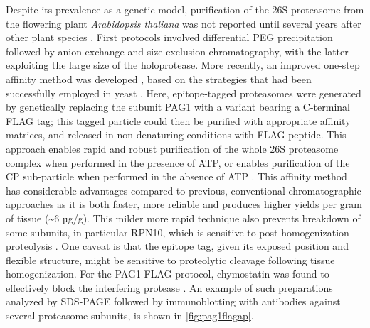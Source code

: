 Despite its prevalence as a genetic model, purification of the 26S proteasome from the flowering plant \textit{Arabidopsis thaliana} was not reported until several years after other plant species \citep{yang04}.  First protocols involved differential PEG precipitation followed by anion exchange and size exclusion chromatography, with the latter exploiting the large size of the holoprotease.  More recently, an improved one-step affinity method was developed \citep{book10}, based on the strategies that had been successfully employed in yeast \citep{leggett05}.  Here, epitope-tagged proteasomes were generated by genetically replacing the subunit PAG1 with a variant bearing a C-terminal FLAG tag; this tagged particle could then be purified with appropriate affinity matrices, and released in non-denaturing conditions with FLAG peptide.  This approach enables rapid and robust purification of the whole 26S proteasome complex when performed in the presence of ATP, or enables purification of the CP sub-particle when performed in the absence of ATP \citep{book10}. This affinity method has considerable advantages compared to previous, conventional chromatographic approaches \citep{yang04} as it is both faster, more reliable and produces higher yields per gram of tissue (\textasciitilde{}6 µg/g). This milder more rapid technique also prevents breakdown of some subunits, in particular RPN10, which is sensitive to post-homogenization proteolysis \citep{yang04}.  One caveat is that the epitope tag, given its exposed position and flexible structure, might be sensitive to proteolytic cleavage following tissue homogenization.  For the PAG1-FLAG protocol, chymostatin was found to effectively block the interfering protease \citep{book10}. An example of such preparations analyzed by SDS-PAGE followed by immunoblotting with antibodies against several proteasome subunits, is shown in \ref{fig:pag1flagap}.

